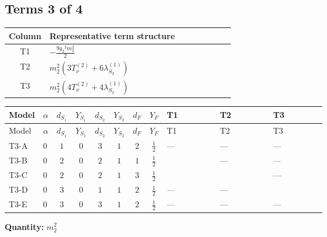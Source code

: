 \documentclass[8pt]{article}
\begin{document}
\begin{landscape}
\subsection*{Terms 3 of 4}
\begin{center}
\begin{tabular}{@{}c >{\raggedright\arraybackslash}p{0.82\linewidth}@{}}
\toprule
Column & Representative term structure \\
\midrule
T1 & \(\displaystyle -\frac{9 {g_2}^2 {m_2^2}}{2}\) \\
\midrule
T2 & \(\displaystyle {m_2^2} (3 T_{\nu}^{(2)}+6 {\lambda_{S_2}^{(1)}})\) \\
\midrule
T3 & \(\displaystyle {m_2^2} (4 T_{\nu}^{(2)}+4 {\lambda_{S_2}^{(1)}})\) \\
\midrule
\bottomrule
\end{tabular}
\end{center}
\smallskip
\tiny
\begin{longtable}{@{}llcccccc >{\raggedright\arraybackslash}p{0.21\linewidth} >{\raggedright\arraybackslash}p{0.21\linewidth} >{\raggedright\arraybackslash}p{0.21\linewidth}@{}}
\toprule
Model & $\alpha$ & $d_{S_1}$ & $Y_{S_1}$ & $d_{S_2}$ & $Y_{S_2}$ & $d_F$ & $Y_F$ & T1 & T2 & T3 \\
\midrule
\endfirsthead
\toprule
Model & $\alpha$ & $d_{S_1}$ & $Y_{S_1}$ & $d_{S_2}$ & $Y_{S_2}$ & $d_F$ & $Y_F$ & T1 & T2 & T3 \\
\midrule
\endhead
T3-A & $0$ & $1$ & $0$ & $3$ & $1$ & $2$ & $\frac{1}{2}$ & --- & --- & --- \\
\midrule
T3-B & $0$ & $2$ & $0$ & $2$ & $1$ & $1$ & $\frac{1}{2}$ & \scriptsize\adjustbox{max width=\linewidth}{$\begin{gathered} -\frac{9 {g_2}^2 {m_2^2}}{2}\end{gathered}$} & --- & --- \\
\midrule
T3-C & $0$ & $2$ & $0$ & $2$ & $1$ & $3$ & $\frac{1}{2}$ & \scriptsize\adjustbox{max width=\linewidth}{$\begin{gathered} -\frac{9 {g_2}^2 {m_2^2}}{2}\end{gathered}$} & \scriptsize\adjustbox{max width=\linewidth}{$\begin{gathered} {m_2^2} (3 T_{\nu}^{(2)}+6 {\lambda_{S_2}^{(1)}})\end{gathered}$} & --- \\
\midrule
T3-D & $0$ & $3$ & $0$ & $1$ & $1$ & $2$ & $\frac{1}{2}$ & --- & --- & \scriptsize\adjustbox{max width=\linewidth}{$\begin{gathered} {m_2^2} (4 T_{\nu}^{(2)}+4 {\lambda_{S_2}^{(1)}})\end{gathered}$} \\
\midrule
T3-E & $0$ & $3$ & $0$ & $3$ & $1$ & $2$ & $\frac{1}{2}$ & --- & --- & --- \\
\midrule
\bottomrule
\end{longtable}
\clearpage
\noindent\textbf{Quantity: }$m_2^2$\par\smallskip

\end{landscape}
\end{document}
